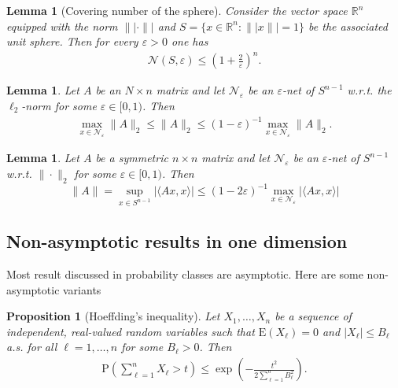 \documentclass[13pt]{article}
\newtheorem{lem}[thm]{Lemma}
\newtheorem{prop}[thm]{Proposition}
\theoremstyle{plain}
\newcommand{\R}{\mathbb{R}}
\newcommand{\NN}{\mathcal{N}}
\newcommand{\E}{\bm{\mathrm{E}}}
\renewcommand{\P}{\bm{\mathrm{P}}}
\newcommand{\set}[1]{\{#1\}}
\begin{document}
\begin{lem}[Covering number of the sphere]
    Consider the vector space $\R^n$ equipped with the norm
    $\||\cdot\||$ and $S = \set{x \in \R^n : \||x\|| = 1}$ be the associated
    unit sphere. Then for every $\varepsilon > 0$ one has
    \[
        \begin{aligned}
            \NN(S, \varepsilon) \le (1 + \frac{2}{\varepsilon})^n.
        \end{aligned}
    \]
\end{lem}

\begin{lem}
    Let $A$ be an $N \times n$ matrix and let $\NN_\varepsilon$ be an
    $\varepsilon$-net of $S^{n-1}$ w.r.t. the $\ell_2$-norm for some
    $\varepsilon \in [0,1)$. Then
    \[
        \begin{aligned}
            \max_{x \in \NN_\varepsilon} \|A\|_2 \le \|A\|_2 \le (1-\varepsilon)^{-1} \max_{x \in \NN_\varepsilon} \|A\|_2.
        \end{aligned}
    \]
\end{lem}

\begin{lem}
    Let $A$ be a symmetric $n \times n$ matrix and let $\NN_\varepsilon$ be
    an $\varepsilon$-net of $S^{n-1}$ w.r.t. $\|\cdot\|_2$ for some $\varepsilon \in [0,1)$.
    Then
    \[
        \|A\| =
        \sup_{x \in S^{n-1}} |\langle Ax, x\rangle|
        \le (1-2\varepsilon)^{-1} \max_{x \in \NN_\varepsilon} | \langle Ax, x \rangle| 
    \]
\end{lem}

\subsection{Non-asymptotic results in one dimension}

Most result discussed in probability classes are asymptotic.
Here are some non-asymptotic variants

\begin{prop}[Hoeffding's inequality]
Let $X_1, \ldots, X_n$ be a sequence of independent, real-valued random
variables such that $\E(X_\ell) = 0$ and $|X_\ell| \le B_\ell$ a.s. for all
$\ell = 1, \ldots, n$ for some $B_\ell > 0$. Then
\[
    \begin{aligned}
        \P \left( \sum_{\ell=1}^{n} X_\ell > t \right) \le \exp \left( - \frac{t^2}{2 \sum_{\ell=1}^{n} B_\ell^2} \right).
    \end{aligned}
\]
\end{prop}
\end{document}
